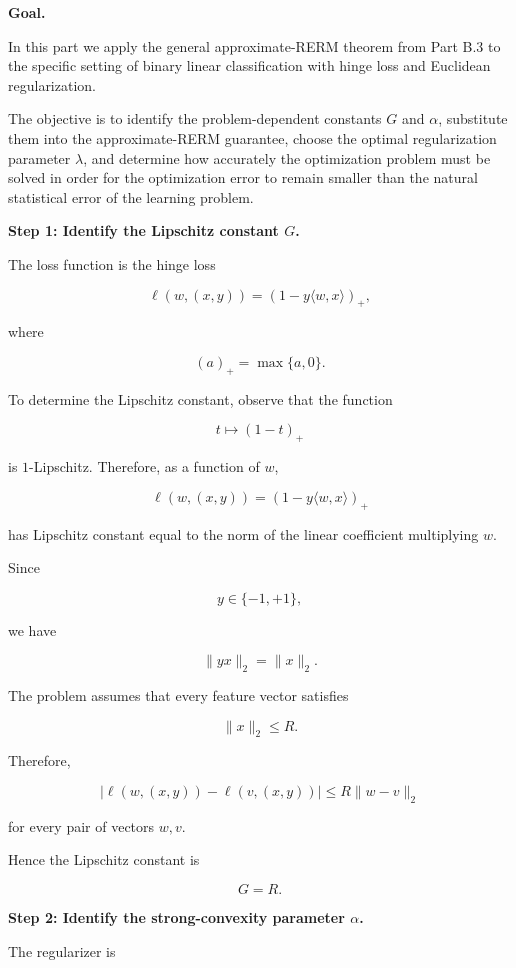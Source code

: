 \documentclass[11pt]{article}
\begin{document}
\begin{enumerate}
\begin{solutionbox}

\textbf{Goal.}

In this part we apply the general approximate-RERM theorem from Part B.3 to the specific setting of binary linear classification with hinge loss and Euclidean regularization.

The objective is to identify the problem-dependent constants \(G\) and \(\alpha\), substitute them into the approximate-RERM guarantee, choose the optimal regularization parameter \(\lambda\), and determine how accurately the optimization problem must be solved in order for the optimization error to remain smaller than the natural statistical error of the learning problem.

\medskip

\textbf{Step 1: Identify the Lipschitz constant \(G\).}

The loss function is the hinge loss

\[
\ell(w,(x,y))
=
(1-y\langle w,x\rangle)_+,
\]

where

\[
(a)_+
=
\max\{a,0\}.
\]

To determine the Lipschitz constant, observe that the function

\[
t \mapsto (1-t)_+
\]

is \(1\)-Lipschitz. Therefore, as a function of \(w\),

\[
\ell(w,(x,y))
=
(1-y\langle w,x\rangle)_+
\]

has Lipschitz constant equal to the norm of the linear coefficient multiplying \(w\).

Since

\[
y\in\{-1,+1\},
\]

we have

\[
\|yx\|_2
=
\|x\|_2.
\]

The problem assumes that every feature vector satisfies

\[
\|x\|_2 \le R.
\]

Therefore,

\[
|\ell(w,(x,y))-\ell(v,(x,y))|
\le
R\|w-v\|_2
\]

for every pair of vectors \(w,v\).

Hence the Lipschitz constant is

\[
\boxed{
G=R.
}
\]

\medskip

\textbf{Step 2: Identify the strong-convexity parameter \(\alpha\).}

The regularizer is


\end{solutionbox}
\end{enumerate}
\end{document}

